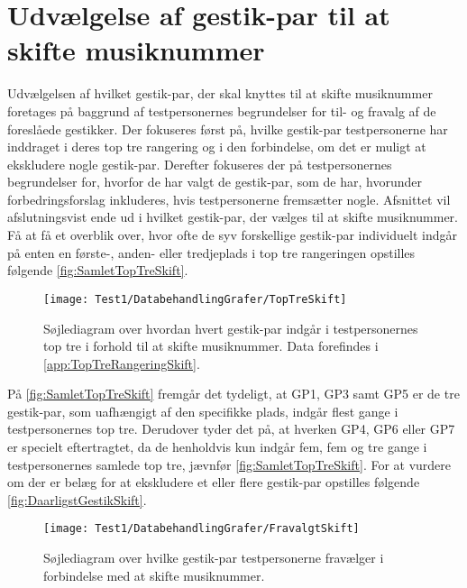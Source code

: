 \section{Udvælgelse af gestik-par til at skifte musiknummer}
\label{TestresultaterSkiftMusiknummer}
%
Udvælgelsen af hvilket gestik-par, der skal knyttes til at skifte musiknummer foretages på baggrund af testpersonernes begrundelser for til- og fravalg af de foreslåede gestikker. Der fokuseres først på, hvilke gestik-par testpersonerne har inddraget i deres top tre rangering og i den forbindelse, om det er muligt at ekskludere nogle gestik-par. Derefter fokuseres der på testpersonernes begrundelser for, hvorfor de har valgt de gestik-par, som de har, hvorunder forbedringsforslag inkluderes, hvis testpersonerne fremsætter nogle. Afsnittet vil afslutningsvist ende ud i hvilket gestik-par, der vælges til at skifte musiknummer.\blankline
%
Få at få et overblik over, hvor ofte de syv forskellige gestik-par individuelt indgår på enten en første-, anden- eller tredjeplads i top tre rangeringen opstilles følgende \autoref{fig:SamletTopTreSkift}. 
%
\begin{figure}[H]
	\centering
	\texttt{[image: Test1/DatabehandlingGrafer/TopTreSkift]}
	\caption{Søjlediagram over hvordan hvert gestik-par indgår i testpersonernes top tre i forhold til at skifte musiknummer. Data forefindes i \autoref{app:TopTreRangeringSkift}.}
	\label{fig:SamletTopTreSkift}
\end{figure}
\noindent
%
På \autoref{fig:SamletTopTreSkift} fremgår det tydeligt, at GP1, GP3 samt GP5 er de tre gestik-par, som uafhængigt af den specifikke plads, indgår flest gange i testpersonernes top tre. Derudover tyder det på, at hverken GP4, GP6 eller GP7 er specielt eftertragtet, da de henholdvis kun indgår fem, fem og tre gange i testpersonernes samlede top tre, jævnfør \autoref{fig:SamletTopTreSkift}. For at vurdere om der er belæg for at ekskludere et eller flere gestik-par opstilles følgende \autoref{fig:DaarligstGestikSkift}. 
\newpage
%
\begin{figure}[H]
	\centering
	\texttt{[image: Test1/DatabehandlingGrafer/FravalgtSkift]}
	\caption{Søjlediagram over hvilke gestik-par testpersonerne fravælger i forbindelse med at skifte musiknummer.}
	\label{fig:DaarligstGestikSkift}
\end{figure}
\noindent
%
